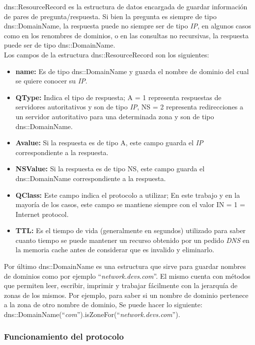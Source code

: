 \documentclass[10pt,a4paper]{article}
\begin{document}
dns::ResourceRecord es la estructura de datos encargada de guardar información de pares de pregunta/respuesta. Si bien la pregunta es siempre de tipo dns::DomainName, la respuesta puede no siempre ser de tipo \textit{IP}, en algunos casos como en los renombres de dominios, o en las consultas no recursivas, la respuesta puede ser  de tipo dns::DomainName.\\

Los campos de la estructura dns::ResourceRecord son los siguientes:

\begin{itemize}
\item \textbf{name: } Es de tipo dns::DomainName y guarda el nombre de dominio del cual se quiere conocer su \textit{IP}.
\item \textbf{QType: } Indica el tipo de respuesta; A = 1 representa respuestas de servidores autoritativos y son de tipo \textit{IP}, NS = 2 representa redirecciones a un servidor autoritativo para una determinada zona y son de tipo dns::DomainName.
\item \textbf{Avalue: } Si la respuesta es de tipo A, este campo guarda el \textit{IP} correspondiente a la respuesta.
\item \textbf{NSValue: } Si la respuesta es de tipo NS, este campo guarda el dns::DomainName correspondiente a la respuesta.
\item \textbf{QClass: } Este campo indica el protocolo a utilizar; En este trabajo y en la mayoría de los casos, este campo se mantiene siempre con el valor IN = 1 = Internet protocol.
\item \textbf{TTL: } Es el tiempo de vida (generalmente en segundos) utilizado para saber cuanto tiempo se puede mantener un recurso obtenido por un pedido \textit{DNS} en la memoria cache antes de considerar que es invalido y eliminarlo.
\end{itemize}

Por último dns::DomainName es una estructura que sirve para guardar nombres de dominios como por ejemplo ``\textit{network.devs.com}''. El mismo cuenta con métodos que permiten leer, escribir, imprimir y trabajar fácilmente con la jerarquía de zonas de los mismos. Por ejemplo, para saber si un nombre de dominio pertenece a la zona de otro nombre de dominio, Se puede hacer lo siguiente: \\

dns::DomainName(``\textit{com}'').isZoneFor(``\textit{network.devs.com}'').
\subsubsection{Funcionamiento del protocolo}
\end{document}

